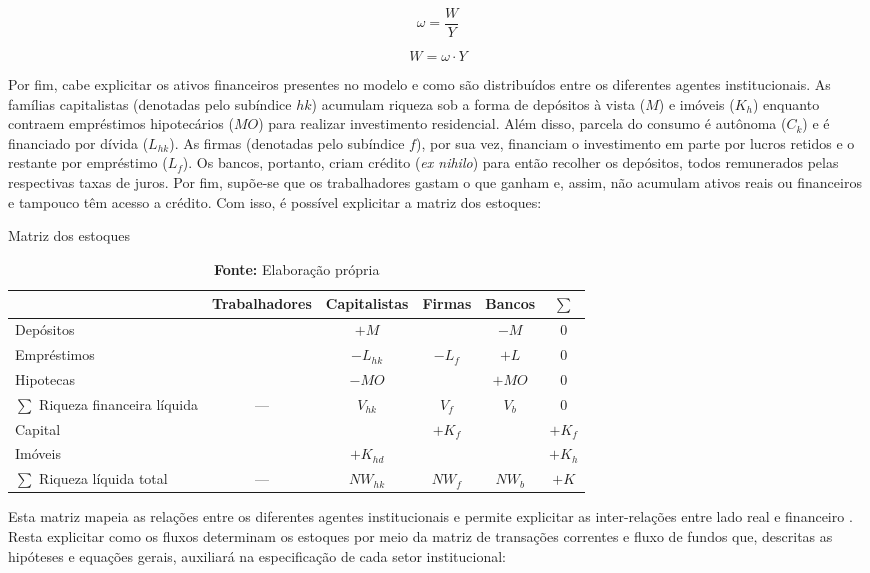 
$$
\omega = \frac{W}{Y}
$$

\begin{equation}
\label{_W}
    W = \omega\cdot Y
\end{equation}

Por fim, cabe explicitar os ativos financeiros presentes no modelo e como são distribuídos entre os diferentes agentes institucionais. As famílias capitalistas (denotadas pelo subíndice $hk$) acumulam riqueza sob a forma de depósitos à vista ($M$) e imóveis ($K_h$) enquanto contraem empréstimos hipotecários ($MO$) para realizar investimento residencial.
Além disso, parcela do consumo é autônoma ($C_k$) e é financiado por dívida ($L_{hk}$).
As firmas (denotadas pelo subíndice $f$), por sua vez, financiam o investimento em parte por lucros retidos e o restante por empréstimo ($L_f$). Os bancos, portanto, criam crédito (\textit{ex nihilo}) para então recolher os depósitos, todos remunerados pelas respectivas taxas de juros. 
Por fim, supõe-se que os trabalhadores gastam o que ganham e, assim, não acumulam ativos reais ou financeiros e tampouco têm acesso a crédito.
Com isso, é possível explicitar a matriz dos estoques:


\begin{table}[H]
\centering
\caption{Matriz dos estoques}
\begin{tabular}{lccccc}
\hline
\hline


                          & Trabalhadores & Capitalistas      & Firmas        & Bancos  &    $\sum$ \\ \hline

Depósitos & & $+M$ & & $-M$ & 0\\
Empréstimos& &$-L_{hk}$ &$-L_f$& $+L$ & 0\\
Hipotecas & &$-MO$&  & $+MO$ & 0\\\hline
$\sum$ Riqueza financeira líquida &--- &$V_{hk}$&$V_f$&$V_b$& $0$\\\hline
Capital & & &$+K_f$&  & $+K_f$\\
Imóveis & &$+K_{hd}$& &   & $+K_h$\\\hline
$\sum$ Riqueza líquida total &---&$NW_{hk}$&$NW_f$&$NW_b$& $+K$\\
\hline
\hline
\end{tabular}%
\caption*{\textbf{Fonte:} Elaboração própria}
\end{table}

Esta matriz mapeia as relações entre os diferentes agentes institucionais e permite explicitar as inter-relações entre lado real e financeiro \cite{dos_santos_revisiting_2010}. Resta explicitar como os fluxos determinam os estoques por meio da matriz de transações correntes e fluxo de fundos que, descritas as hipóteses e equações gerais, auxiliará na especificação de cada setor institucional:

